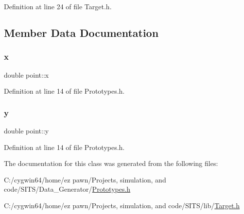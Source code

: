 Definition at line 24 of file Target.\+h.



\subsection{Member Data Documentation}
\mbox{\label{classpoint_a9c6b34deaf4900ad4193c17935fd384a}} 
\subsubsection{\texorpdfstring{x}{x}}
{\footnotesize\ttfamily double point\+::x}



Definition at line 14 of file Prototypes.\+h.

\mbox{\label{classpoint_a613f8f0d7352731638b0094e1b958b87}} 
\subsubsection{\texorpdfstring{y}{y}}
{\footnotesize\ttfamily double point\+::y}



Definition at line 14 of file Prototypes.\+h.



The documentation for this class was generated from the following files\+:\begin{DoxyCompactItemize}
\item 
C\+:/cygwin64/home/ez pawn/\+Projects, simulation, and code/\+S\+I\+T\+S/\+Data\+\_\+\+Generator/\hyperlink{_data___generator_2_prototypes_8h}{Prototypes.\+h}\item 
C\+:/cygwin64/home/ez pawn/\+Projects, simulation, and code/\+S\+I\+T\+S/lib/\hyperlink{_target_8h}{Target.\+h}\end{DoxyCompactItemize}
